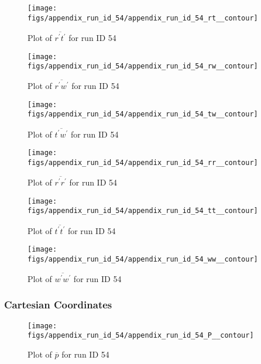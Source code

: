 \begin{figure}[H]
\centering
\texttt{[image: figs/appendix\_run\_id\_54/appendix\_run\_id\_54\_rt\_\_contour]}
\caption{Plot of $\overline{r^\prime t^\prime}$ for run ID 54}
\label{fig:appendix_run_id_54_rt__contour}
\end{figure}


\begin{figure}[H]
\centering
\texttt{[image: figs/appendix\_run\_id\_54/appendix\_run\_id\_54\_rw\_\_contour]}
\caption{Plot of $\overline{r^\prime w^\prime}$ for run ID 54}
\label{fig:appendix_run_id_54_rw__contour}
\end{figure}


\begin{figure}[H]
\centering
\texttt{[image: figs/appendix\_run\_id\_54/appendix\_run\_id\_54\_tw\_\_contour]}
\caption{Plot of $\overline{t^\prime w^\prime}$ for run ID 54}
\label{fig:appendix_run_id_54_tw__contour}
\end{figure}


\begin{figure}[H]
\centering
\texttt{[image: figs/appendix\_run\_id\_54/appendix\_run\_id\_54\_rr\_\_contour]}
\caption{Plot of $\overline{r^\prime r^\prime}$ for run ID 54}
\label{fig:appendix_run_id_54_rr__contour}
\end{figure}


\begin{figure}[H]
\centering
\texttt{[image: figs/appendix\_run\_id\_54/appendix\_run\_id\_54\_tt\_\_contour]}
\caption{Plot of $\overline{t^\prime t^\prime}$ for run ID 54}
\label{fig:appendix_run_id_54_tt__contour}
\end{figure}


\begin{figure}[H]
\centering
\texttt{[image: figs/appendix\_run\_id\_54/appendix\_run\_id\_54\_ww\_\_contour]}
\caption{Plot of $\overline{w^\prime w^\prime}$ for run ID 54}
\label{fig:appendix_run_id_54_ww__contour}
\end{figure}


\subsubsection{Cartesian Coordinates}
\begin{figure}[H]
\centering
\texttt{[image: figs/appendix\_run\_id\_54/appendix\_run\_id\_54\_P\_\_contour]}
\caption{Plot of $\overline{p}$ for run ID 54}
\label{fig:appendix_run_id_54_P__contour}
\end{figure}


